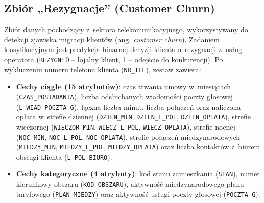 \subsection{Zbiór „Rezygnacje” (Customer Churn)}
Zbiór danych pochodzący z~sektora telekomunikacyjnego, wykorzystywany do detekcji zjawiska migracji klientów (ang. \textit{customer churn}). Zadaniem klasyfikacyjnym jest predykcja binarnej decyzji klienta o~rezygnacji z~usług operatora (\texttt{REZYGN}: 0 – lojalny klient, 1 – odejście do konkurencji). Po wykluczeniu numeru telefonu klienta (\texttt{NR\_TEL}), zestaw zawiera:
\begin{itemize}
    \item \textbf{Cechy ciągłe (15 atrybutów)}: czas trwania umowy w~miesiącach (\texttt{CZAS\_POSIADANIA}), liczba odsłuchanych wiadomości poczty głosowej (\texttt{L\_WIAD\_POCZTA\_G}), łączna liczba minut, liczba połączeń oraz naliczona opłata w~strefie dziennej (\texttt{DZIEN\_MIN}, \texttt{DZIEN\_L\_POL}, \texttt{DZIEN\_OPLATA}), strefie wieczornej (\texttt{WIECZOR\_MIN}, \texttt{WIECZ\_L\_POL}, \texttt{WIECZ\_OPLATA}), strefie nocnej (\texttt{NOC\_MIN}, \texttt{NOC\_L\_POL}, \texttt{NOC\_OPLATA}), strefie połączeń międzynarodowych (\texttt{MIEDZY\_MIN}, \texttt{MIEDZY\_L\_POL}, \texttt{MIEDZY\_OPLATA}) oraz liczba kontaktów z~biurem obsługi klienta (\texttt{L\_POL\_BIURO}).
    \item \textbf{Cechy kategoryczne (4 atrybuty)}: kod stanu zamieszkania (\texttt{STAN}), numer kierunkowy obszaru (\texttt{KOD\_OBSZARU}), aktywność międzynarodowego planu taryfowego (\texttt{PLAN\_MIEDZY}) oraz aktywność usługi poczty głosowej (\texttt{POCZTA\_G}).
\end{itemize}

